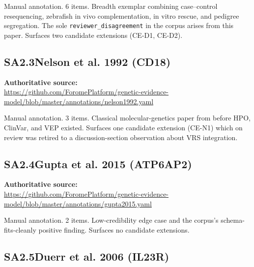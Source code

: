 \medskip
\noindent Manual annotation. 6 \GeneticEvidence{} items. Breadth
exemplar combining case--control resequencing, zebrafish in vivo
complementation, in vitro rescue, and pedigree segregation. The sole
\texttt{reviewer\_disagreement} in the corpus arises from this paper.
Surfaces two candidate extensions (CE-D1, CE-D2).



\subsection*{SA2.3\quad Nelson et al. 1992 (CD18)}

\noindent\textbf{Authoritative source:}\\
\url{https://github.com/ForomePlatform/genetic-evidence-model/blob/master/annotations/nelson1992.yaml}

\medskip
\noindent Manual annotation. 3 \GeneticEvidence{} items. Classical
molecular-genetics paper from before HPO, ClinVar, and VEP existed.
Surfaces one candidate extension (CE-N1) which on review was retired to
a discussion-section observation about VRS integration.



\subsection*{SA2.4\quad Gupta et al. 2015 (ATP6AP2)}

\noindent\textbf{Authoritative source:}\\
\url{https://github.com/ForomePlatform/genetic-evidence-model/blob/master/annotations/gupta2015.yaml}

\medskip
\noindent Manual annotation. 2 \GeneticEvidence{} items.
Low-credibility edge case and the corpus's schema-fits-cleanly
positive finding. Surfaces no candidate extensions.



\subsection*{SA2.5\quad Duerr et al. 2006 (IL23R)}

